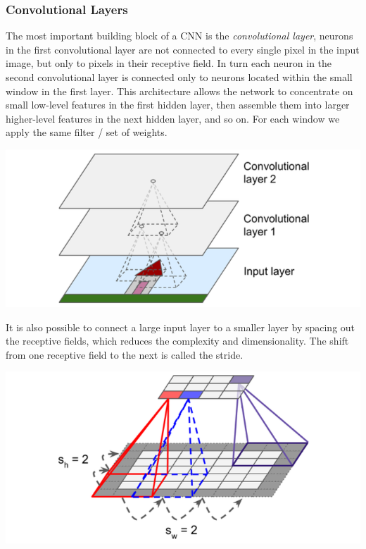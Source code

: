 \documentclass[12pt]{article}
\begin{document}
        \subsubsection{Convolutional Layers}
            The most important building block of a CNN is the \textit{convolutional layer}, neurons in the first
            convolutional layer are not connected to every single pixel in the input image, but only to pixels in their
            receptive field. In turn each neuron in the second convolutional layer is connected only to neurons located
            within the small window in the first layer. This architecture allows the network to concentrate on small
            low-level features in the first hidden layer, then assemble them into larger higher-level features in the
            next hidden layer, and so on. For each window we apply the same filter / set of weights. 

            \begin{center}
                \includegraphics[scale=0.65]{ConvLayer}
            \end{center}

            It is also possible to connect a large input layer to a smaller layer by spacing out the receptive fields, which reduces the
            complexity and dimensionality. The shift from one receptive field to the next is called the stride. 
            
            \begin{center}
                \includegraphics[scale=0.65]{ConvStride}
            \end{center}
\end{document}
